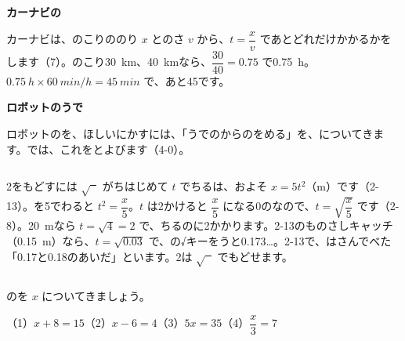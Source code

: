 \begin{butsuri}
\vspace{4pt}
\par\addvspace{3pt}\textbf{カーナビの}\par\noindent カーナビは、のこりののり $x$ とのさ $v$ から、$t=\dfrac{x}{v}$ であとどれだけかかるかをします（7）。のこり\qty{30}{km}、\qty{40}{km}なら、$\dfrac{30}{40}=0.75$ で\qty{0.75}{h}。$\qty{0.75}{h}\times\qty{60}{min/h}=\qty{45}{min}$ で、あと45です。

\vspace{2pt}
\par\addvspace{3pt}\textbf{ロボットのうで}\par\noindent ロボットのを、ほしいにかすには、「うでのからのをめる」を、についてきます。では、これを\textbf{}とよびます（4-0）。
\end{butsuri}

\begin{column}{2をもどすには $\sqrt{\phantom{x}}$}
がちはじめて $t$ でちるは、およそ $x=5t^2$（m）です（2-13）。を5でわると $t^2=\dfrac{x}{5}$。$t$ は2かけると $\dfrac{x}{5}$ になる0のなので、$t=\sqrt{\dfrac{x}{5}}$ です（2-8）。\qty{20}{m}なら $t=\sqrt{4}=2$ で、ちるのに2かかります。2-13のものさしキャッチ（\qty{0.15}{m}）なら、$t=\sqrt{0.03}$ で、の√キーをうと0.173…。2-13で、はさんでべた「0.17と0.18のあいだ」といます。2は $\sqrt{\phantom{x}}$ でもどせます。
\end{column}

\bkendproblems
{}

\bkproblem {}のを $x$ についてきましょう。\par
\hspace*{1\zw}（1）\nobreak $x+8=15$\quad（2）\nobreak $x-6=4$\quad（3）\nobreak $5x=35$\quad（4）\nobreak $\dfrac{x}{3}=7$

